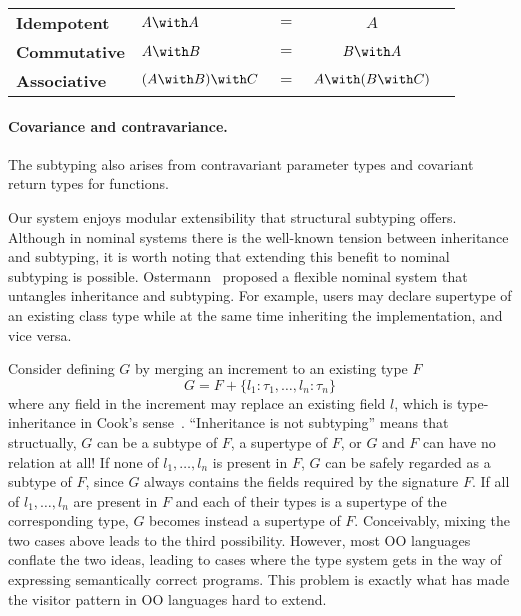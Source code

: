 
\begin{tabular}{llrcl}
  \textbf{Idempotent}  & $A \andop A$            & $=$ & $A$ \\
  \textbf{Commutative} & $A \andop B$            & $=$ & $B \andop A$ \\
  \textbf{Associative} & $(A \andop B) \andop C$ & $=$ & $A \andop (B \andop C)$ 
\end{tabular}

\paragraph{Covariance and contravariance.}
The subtyping also arises from contravariant parameter types
and covariant return types for functions. 

Our system enjoys modular extensibility that structural subtyping offers.
Although in nominal systems there is the well-known tension between inheritance
and subtyping, it is worth noting that extending this benefit to nominal
subtyping is possible. Ostermann~\cite{ostermann2008nominal} proposed a flexible
nominal system that untangles inheritance and subtyping. For example, users may
declare supertype of an existing class type while at the same time inheriting
the implementation, and vice versa.

Consider defining $G$ by merging an increment to an existing type $F$
\[
G = F + \{ l_1:\tau_1, \ldots, l_n:\tau_n \}
\]
where any field in the increment may replace an existing field $l$, which is
type-inheritance in Cook's sense~\cite{cook1989inheritance}. 
``Inheritance is not subtyping'' means that structually, 
$G$ can be a subtype of $F$, a supertype of $F$, or $G$ and $F$ can have no relation at all! 
If none of $l_1, \ldots, l_n$ is present in $F$, $G$ can be safely regarded as a subtype of $F$, since $G$ always contains the fields required by the signature $F$.
If all of $l_1, \ldots, l_n$ are present in $F$
and each of their types is a supertype of the corresponding type, $G$ becomes instead a supertype of $F$.
Conceivably, mixing the two cases above leads to the third possibility.
However, most OO languages conflate the two ideas, leading to cases
where the type system gets in the way of expressing semantically correct programs. 
This problem is exactly what has made the visitor pattern in OO languages hard to extend.


